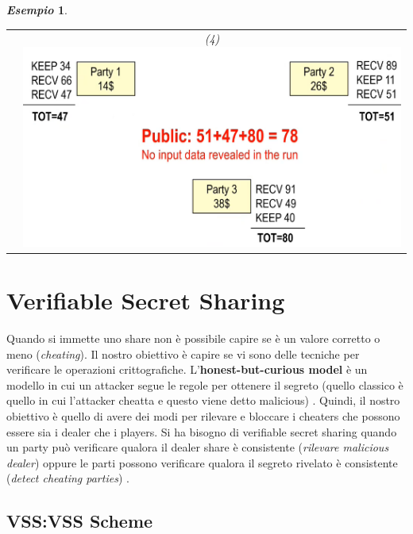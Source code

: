 \documentclass{book}
\newtheorem{esempio}{\emph{Esempio}}
\begin{document}
\begin{esempio}
\begin{tabular}{c c}
         &
        (4)\includegraphics[scale=0.5]{2021-12-29-23-47-08.png}%
        \\
    \end{tabular}
\end{esempio}
\chapter{Verifiable Secret Sharing}
Quando si immette uno share non è possibile capire se è un valore corretto o meno (\emph{cheating})\@. Il nostro obiettivo è capire se vi sono delle tecniche per verificare le operazioni crittografiche\@.\newline
L'\textbf{honest-but-curious model} è un modello in cui un attacker segue le regole per ottenere il segreto (quello classico è quello in cui l'attacker cheatta e questo viene detto malicious) \@. Quindi, il nostro obiettivo è quello di avere dei modi per rilevare e bloccare i cheaters che possono essere sia i dealer che i players\@.\newline
Si ha bisogno di verifiable secret sharing quando un party può verificare qualora il dealer share è consistente (\emph{rilevare malicious dealer}) oppure le parti possono verificare qualora il segreto rivelato è consistente (\emph{detect cheating parties}) \@.
\section{VSS:\@Feldman VSS Scheme}
\end{document}
